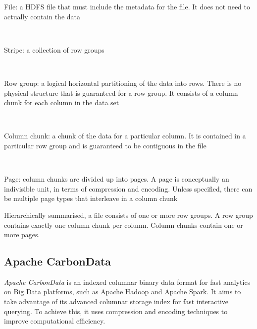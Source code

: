 \documentclass[10pt, a4paper]{report}
\begin{document}
\begin{itemize}
	\begin{minipage}{0.92\textwidth}
		\item File: a HDFS file that must include the metadata for the file. It does not need to actually contain the data \\
	\end{minipage} \\
	\begin{minipage}{0.92\textwidth}
		\item Stripe: a collection of row groups \\
	\end{minipage} \\
	\begin{minipage}{0.92\textwidth}
		\item Row group: a logical horizontal partitioning of the data into rows. There is no physical structure that is guaranteed for a row group. It consists of a column chunk for each column in the data set \\
	\end{minipage} \\
	\begin{minipage}{0.92\textwidth}
		\item Column chunk: a chunk of the data for a particular column. It is contained in a particular row group and is guaranteed to be contiguous in the file \\
	\end{minipage} \\
	\begin{minipage}{0.92\textwidth}
		\item Page: column chunks are divided up into pages. A page is conceptually an indivisible unit, in terms of compression and encoding. Unless specified, there can be multiple page types that interleave in a column chunk \\
	\end{minipage}
\end{itemize}

Hierarchically summarised, a file consists of one or more row groups. A row group contains exactly one column chunk per column. Column chunks contain one or more pages.

\subsection{Apache CarbonData}

\textit{Apache CarbonData} is an indexed columnar binary data format for fast analytics on Big Data platforms\cite{carbondata_homepage}, such as Apache Hadoop and Apache Spark. It aims to take advantage of its advanced columnar storage index for fast interactive querying. To achieve this, it uses compression and encoding techniques to improve computational efficiency.
\end{document}
